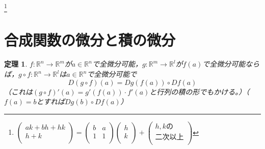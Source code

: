 \documentclass[dvipdfmx,a4j,10pt]{jsarticle}
\theoremstyle{mystyle1}
\newtheorem{thm}[dfn]{定理}
\theoremstyle{mystyle2}
\begin{document}
\footnote{
$
\begin{pmatrix}
ak+bh+hk \\
h+k \\
\end{pmatrix}
=
\begin{pmatrix}
b & a \\
1 & 1\\
\end{pmatrix}
\begin{pmatrix}
h \\
k \\
\end{pmatrix}
+
\begin{pmatrix}
h,kの\\
二次以上 \\
\end{pmatrix}
$
}



\newpage


\section{合成関数の微分と積の微分}

\begin{framed}
	\begin{thm}\label{th2.2}
		$f:\mathbb{R}^n\to\mathbb{R}^m$が$a\in\mathbb{R}^n$で全微分可能，$g:\mathbb{R}^m\to\mathbb{R}^l$が$f(a)$で全微分可能ならば，$g\circ f:\mathbb{R}^n\to\mathbb{R}^l$は$a\in\mathbb{R}^n$で全微分可能で
		\[
		D(g\circ f)(a)=Dg(f(a))\circ Df(a)
		\]
		（これは$(g\circ f)'(a)=g'(f(a))\cdot f'(a)$と行列の積の形でもかける。）（$f(a)=b$とすれば$Dg(b)\circ Df(a)$）
	\end{thm}
\end{framed}
\end{document}
